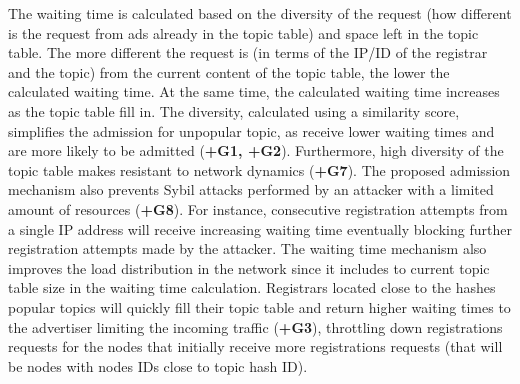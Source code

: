 The waiting time is calculated based on the diversity of the request (\ie how different is the request from ads already in the topic table) and space left in the topic table. 
The more different the request is (in terms of the IP/ID of the registrar and the topic) from the current content of the topic table, the lower the calculated waiting time. 
At the same time,  the calculated waiting time increases as the topic table fill in. 
The diversity,  calculated using a similarity score,  simplifies the admission for unpopular topic, as receive lower waiting times and are more likely to be admitted (\textbf{+G1, +G2}).
Furthermore,  high diversity of the topic table makes \sysname resistant to network dynamics (\textbf{+G7}). The proposed admission mechanism also prevents Sybil attacks performed by an attacker with a limited amount of resources (\textbf{+G8}). 
For instance, consecutive registration attempts from a single IP address will receive increasing waiting time eventually blocking further registration attempts made by the attacker. 
The waiting time mechanism also improves the load distribution in the network since it includes to current topic table size in the waiting time calculation.
Registrars located close to the hashes popular topics will quickly fill their topic table and return higher waiting times to the advertiser limiting the incoming traffic (\textbf{+G3}),  throttling down registrations requests for the nodes that initially receive more registrations requests (that will be nodes with nodes IDs close to topic hash ID).